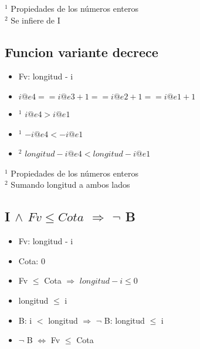 \noindent $ ^1 $ Propiedades de los números enteros\\
$ ^2 $ Se infiere de I\\

\subsection{Funcion variante decrece}
\begin{itemize}
	\item Fv: longitud - i
	\item $ i@e4 == i@e3 + 1== i@e2 + 1 == i@e1 + 1 $
	\item $ ^1 $ $ i@e4 > i@e1 $
	\item $ ^1 $ $ - i@e4 < - i@e1 $
	\item $ ^2 $ \textcolor{NavyBlue}{ $ longitud - i@e4 < longitud - i@e1 $} \checkmark	
\end{itemize}
\vspace{3mm}

\noindent $ ^1 $ Propiedades de los números enteros\\
$ ^2 $ Sumando longitud a ambos lados\\

\subsection{I $ \land $ $ Fv \leq Cota $ $ \Rightarrow $ $ \lnot $ B}
\begin{itemize}
	\item Fv: longitud - i
	\item Cota: 0
	\item Fv $ \leq $ Cota $ \Rightarrow $ $ longitud - i \leq 0 $ 
	\item longitud $ \leq $ i
	\item B: i $ < $ longitud $ \Rightarrow $ $ \lnot $ B: longitud $ \leq $ i
	\item \textcolor{NavyBlue}{ $ \lnot $ B $ \Leftrightarrow $ Fv  $ \leq $ Cota} \checkmark	
\end{itemize}
\vspace{3mm}

